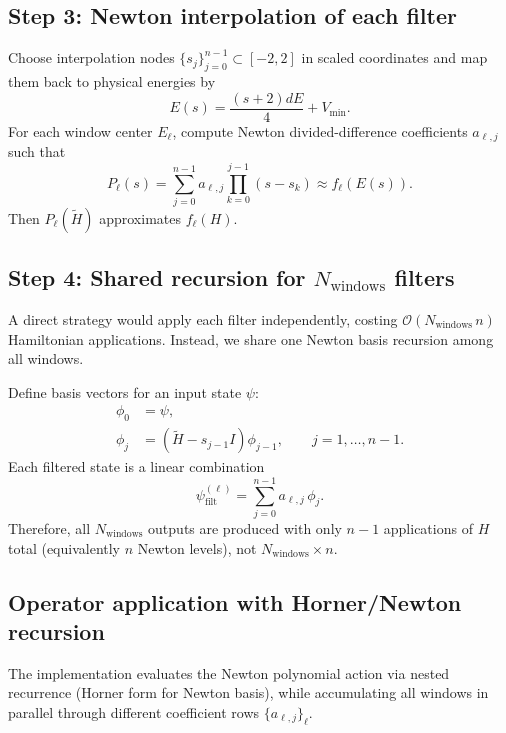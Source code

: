 \subsection{Step 3: Newton interpolation of each filter}

Choose interpolation nodes $\{s_j\}_{j=0}^{n-1}\subset[-2,2]$ in scaled
coordinates and map them back to physical energies by
\begin{equation}
E(s)=\frac{(s+2)dE}{4}+V_{\min}.
\end{equation}
For each window center $E_\ell$, compute Newton divided-difference
coefficients $a_{\ell,j}$ such that
\begin{equation}
P_\ell(s)=\sum_{j=0}^{n-1} a_{\ell,j}
\prod_{k=0}^{j-1}(s-s_k)
\approx f_\ell(E(s)).
\label{eq:newton_poly}
\end{equation}
Then $P_\ell(\widetilde{H})$ approximates $f_\ell(H)$.

\subsection{Step 4: Shared recursion for $N_{\mathrm{windows}}$ filters}

A direct strategy would apply each filter independently, costing
$\mathcal{O}(N_{\mathrm{windows}}\,n)$ Hamiltonian applications.
Instead, we share one Newton basis recursion among all windows.

Define basis vectors for an input state $\psi$:
\begin{align}
\phi_0 &= \psi,\\
\phi_j &= (\widetilde{H}-s_{j-1}I)\phi_{j-1}, \qquad j=1,\dots,n-1.
\label{eq:basis_rec}
\end{align}
Each filtered state is a linear combination
\begin{equation}
\psi^{(\ell)}_{\mathrm{filt}} = \sum_{j=0}^{n-1} a_{\ell,j}\,\phi_j.
\label{eq:combine}
\end{equation}
Therefore, all $N_{\mathrm{windows}}$ outputs are produced with only
$n-1$ applications of $H$ total (equivalently $n$ Newton levels), not
$N_{\mathrm{windows}}\times n$.

\subsection{Operator application with Horner/Newton recursion}

The implementation evaluates the Newton polynomial action via nested
recurrence (Horner form for Newton basis), while accumulating all windows in
parallel through different coefficient rows $\{a_{\ell,j}\}_{\ell}$.


